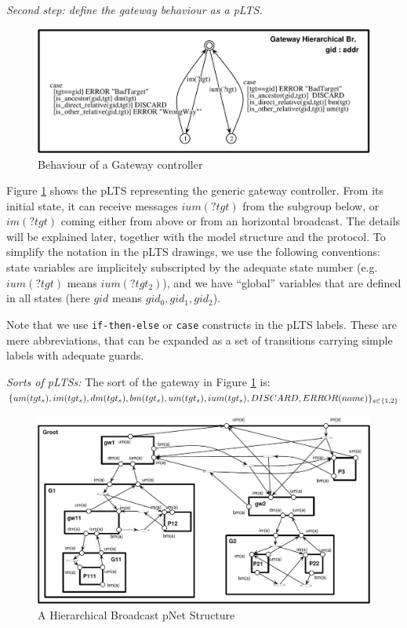 \documentclass{lncs/llncs}
\newcommand{\TODO}[1]{\textcolor{red}{\textbf{[TODO:#1]}}}
\begin{document}
\begin{example}  \emph{Second step: define the gateway behaviour as a pLTS.}

\begin{figure}[h]
\centerline{  \includegraphics[width=0.85\linewidth]{ATG/GatewayHB}}
\caption{Behaviour of a Gateway controller %
  }
  \label{fig:hb-HBgateway}
\end{figure}
Figure \ref{fig:hb-HBgateway} shows the pLTS representing the generic
gateway controller. From its initial state, it can receive messages
$ium(?tgt)$ from the subgroup below, or $im(?tgt)$
coming either from above or from an horizontal broadcast. The details will
be explained later, together with the model structure and the
protocol.
To simplify the notation in the pLTS drawings, we use the following
conventions: state variables are implicitely subscripted by the
adequate state number (e.g. $ium(?tgt)$ means $ium(?tgt_2)$), and we
have ``global'' variables that are defined in all states (here $gid$
means $gid_0,gid_1,gid_2$).

Note that we use \texttt{if-then-else} or \texttt{case}
constructs in the pLTS labels. These are mere abbreviations, that can
be expanded as a set of transitions carrying simple labels with adequate guards.
\end{example}

\begin{example} \emph{Sorts of pLTSs:}
  The sort of the gateway in Figure \ref{fig:hb-HBgateway} is:\\
  $\large\{ um(tgt_s), im(tgt_s), dm(tgt_s), bm(tgt_s), um(tgt_s),
  ium(tgt_s), DISCARD, \\ERROR(name) \large\}_{s\in\{1,2\}}$
\end{example}

\begin{figure}[t]
  \includegraphics[width=1.0\linewidth]{ATG/Inst5}
  \caption{A Hierarchical Broadcast pNet Structure}\label{fig:hb-pnet-graphical}
 \end{figure}
\end{document}
